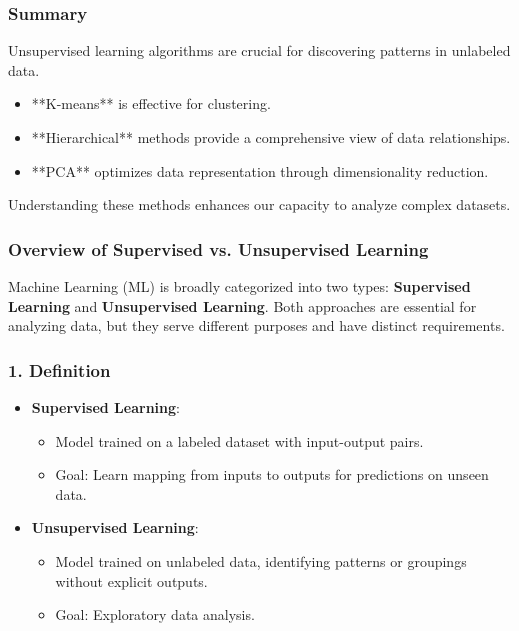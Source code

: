 \documentclass[aspectratio=169]{beamer}
\begin{document}
\begin{frame}[fragile]
    \frametitle{Summary}
    Unsupervised learning algorithms are crucial for discovering patterns in unlabeled data. 
    \begin{itemize}
        \item **K-means** is effective for clustering.
        \item **Hierarchical** methods provide a comprehensive view of data relationships.
        \item **PCA** optimizes data representation through dimensionality reduction.
    \end{itemize}
    Understanding these methods enhances our capacity to analyze complex datasets.
\end{frame}

\begin{frame}[fragile]
    \frametitle{Overview of Supervised vs. Unsupervised Learning}
    Machine Learning (ML) is broadly categorized into two types: 
    \textbf{Supervised Learning} and \textbf{Unsupervised Learning}. Both approaches are essential for analyzing data, but they serve different purposes and have distinct requirements.
\end{frame}

\begin{frame}[fragile]
    \frametitle{1. Definition}
    \begin{itemize}
        \item \textbf{Supervised Learning}: 
        \begin{itemize}
            \item Model trained on a labeled dataset with input-output pairs.
            \item Goal: Learn mapping from inputs to outputs for predictions on unseen data.
        \end{itemize}
        
        \item \textbf{Unsupervised Learning}: 
        \begin{itemize}
            \item Model trained on unlabeled data, identifying patterns or groupings without explicit outputs.
            \item Goal: Exploratory data analysis.
        \end{itemize}
    \end{itemize}
\end{frame}
\end{document}

